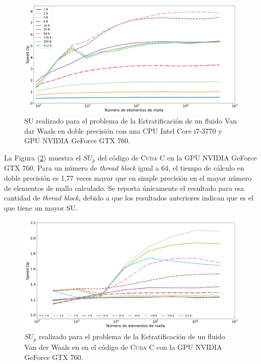 \begin{figure}[htbp]
	\centering
	\includegraphics[width=\textwidth]{figs/cap4/s_760_VdW_double_10}
	\caption{SU realizado para el problema de la Estratificación de un fluido Van dar Waals en doble precisión con una CPU Intel Core i7-3770 y GPU NVIDIA GeForce GTX 760.} 
	\label{fig:s_760_VdW_double_10}	
\end{figure}

La Figura (\ref{fig:c_760_VdW_cuda_10}) muestra el ${SU}_p$ del código de \textsc{Cuda C} en la GPU NVIDIA GeForce GTX 760. Para un número de \textit{thread block} igual a 64, el tiempo de cálculo en doble precisión es 1,77 veces mayor que en simple precisión en el mayor número de elementos de malla calculado. Se reporta únicamente el resultado para esa cantidad de \textit{thread block}, debido a que los resultados anteriores indican que es el que tiene un mayor SU.

\begin{figure}[h!]
	\centering
	\includegraphics[width=\textwidth]{figs/cap4/c_760_MxC_cuda_10}
	\caption{$SU_p$ realizado para el problema de la Estratificación de un fluido Van der Waals en en el código de \textsc{Cuda C} con la GPU NVIDIA GeForce GTX 760.} 
	\label{fig:c_760_VdW_cuda_10}	
\end{figure}

